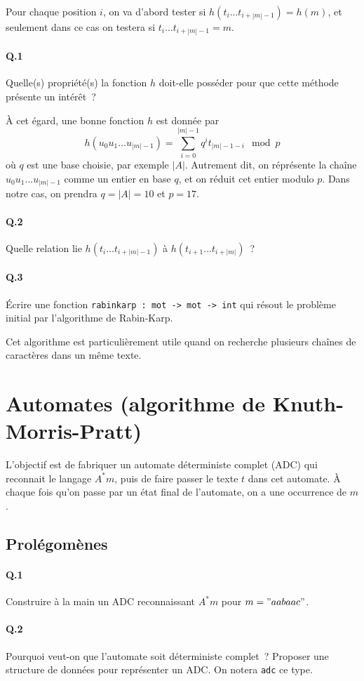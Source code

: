 \documentclass[10pt,a4paper]{article}
\begin{document}
Pour chaque position $i$, on va d'abord tester si $h(t_i...t_{i+|m|-1}) = h(m)$, et
seulement dans ce cas on testera si $t_i...t_{i+|m|-1} = m$.
\paragraph{Q.1} Quelle(s) propriété(s) la fonction $h$ doit-elle posséder pour 
que cette méthode présente un intérêt~?

À cet égard, une bonne fonction $h$ est donnée par
\[h(u_0u_1\dots u_{|m|-1}) = \sum_{i=0}^{|m|-1} q^i t_{|m|-1-i} \mod p\]
où $q$ est une base choisie, par exemple $|A|$. Autrement dit, on réprésente la
chaîne $u_0u_1\dots u_{|m|-1}$ comme un entier en base $q$, et on réduit cet 
entier modulo $p$. Dans notre cas, on prendra $q=|A|=10$ et $p=17$.
\paragraph{Q.2} Quelle relation lie $h(t_i...t_{i+|m|-1})$ 
à $h(t_{i+1}...t_{i+|m|})$~?
\paragraph{Q.3} Écrire une fonction \texttt{rabinkarp : mot -> mot -> int} qui 
résout le problème initial par l'algorithme de Rabin-Karp.

Cet algorithme est particulièrement utile quand on recherche plusieurs chaînes 
de caractères dans un même texte.
\section{Automates (algorithme de Knuth-Morris-Pratt)}
L'objectif est de fabriquer un automate déterministe complet (ADC) qui reconnait
le langage $A^* m$, puis de faire passer le texte $t$ dans cet automate. À 
chaque fois qu'on passe par un état final de l'automate, on a une occurrence de 
$m$.
\subsection{Prolégomènes}
\paragraph{Q.1} Construire à la main un ADC reconnaissant $A^* m$ pour $m="aabaac"$.
\paragraph{Q.2} Pourquoi veut-on que l'automate soit déterministe complet~? 
Proposer une structure de données pour représenter un ADC. On notera 
\texttt{adc} ce type.
\end{document}
